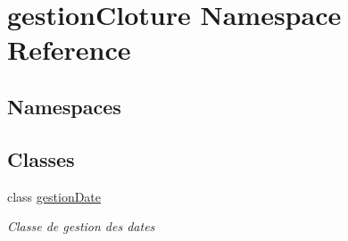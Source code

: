 \hypertarget{namespacegestion_cloture}{}\section{gestion\+Cloture Namespace Reference}
\label{namespacegestion_cloture}
\subsection*{Namespaces}
\begin{DoxyCompactItemize}
\end{DoxyCompactItemize}
\subsection*{Classes}
\begin{DoxyCompactItemize}
\item 
class \mbox{\hyperlink{classgestion_cloture_1_1gestion_date}{gestion\+Date}}
\begin{DoxyCompactList}\small\item\em Classe de gestion des dates \end{DoxyCompactList}\end{DoxyCompactItemize}
